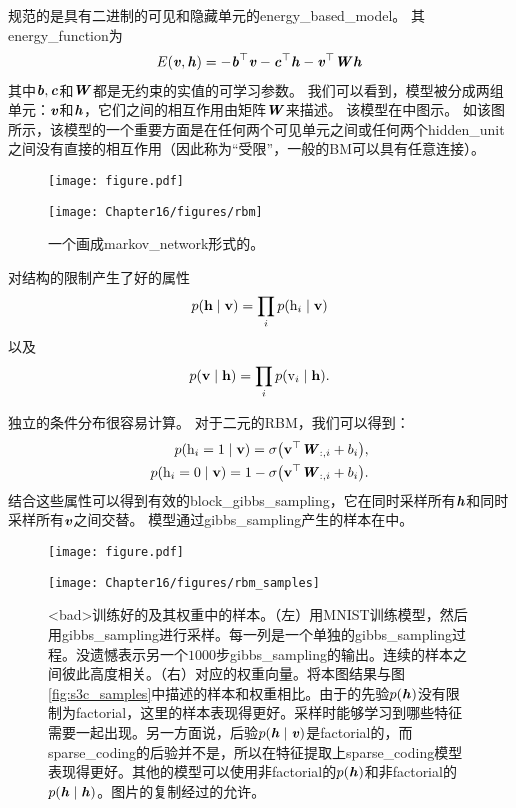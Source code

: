 规范的是具有二进制的可见和隐藏单元的\gls{energy_based_model}。 其\gls{energy_function}为
\begin{align}
\label{eqn:1610}
E(\boldsymbol{\mathit{v}},\boldsymbol{\mathit{h}}) = -\boldsymbol{\mathit{b}}^{\top}\boldsymbol{\mathit{v}} - \boldsymbol{\mathit{c}}^{\top}\boldsymbol{\mathit{h}} - \boldsymbol{\mathit{v}}^{\top}\boldsymbol{\mathit{W}}\boldsymbol{\mathit{h}}
\end{align}
其中$\boldsymbol{\mathit{b}},\boldsymbol{\mathit{c}}$和$\boldsymbol{\mathit{W}}$都是无约束的实值的可学习参数。
我们可以看到，模型被分成两组单元：$\boldsymbol{\mathit{v}}$和$\boldsymbol{\mathit{h}}$，它们之间的相互作用由矩阵$\boldsymbol{\mathit{W}}$来描述。
该模型在中图示。
如该图所示，该模型的一个重要方面是在任何两个可见单元之间或任何两个\gls{hidden_unit}之间没有直接的相互作用（因此称为``受限''，一般的\gls{BM}可以具有任意连接）。



\begin{figure}[!htb]
\ifOpenSource
\centerline{\texttt{[image: figure.pdf]}}
\else
	\centerline{\texttt{[image: Chapter16/figures/rbm]}}	
\fi
	\caption{一个画成\gls{markov_network}形式的。}
	\label{fig:rbm}
\end{figure}



对结构的限制产生了好的属性
\begin{align}
\label{eqn:1611}
p(\mathbf{h}\mid\mathbf{v}) = \prod_i p(\mathrm{h}_i\mid \mathbf{v})
\end{align}
以及
\begin{align}
\label{eqn:1612}
p(\mathbf{v}\mid\mathbf{h}) = \prod_i p(\mathrm{v}_i\mid \mathbf{h}).
\end{align}


独立的条件分布很容易计算。
对于二元的\gls{RBM}，我们可以得到：
\begin{align}
\label{eqn:1613}
\begin{aligned}
p(\mathrm{h}_i = 1\mid\mathbf{v}) = \sigma\big(\mathbf{v}^{\top}\boldsymbol{\mathit{W}}_{:,i} + b_i\big),\\
p(\mathrm{h}_i = 0\mid\mathbf{v}) = 1 - \sigma\big(\mathbf{v}^{\top}\boldsymbol{\mathit{W}}_{:,i} + b_i\big).\\
\end{aligned}
\end{align}
结合这些属性可以得到有效的\gls{block_gibbs_sampling}，它在同时采样所有$\boldsymbol{\mathit{h}}$和同时采样所有$\boldsymbol{\mathit{v}}$之间交替。
模型通过\gls{gibbs_sampling}产生的样本在中。

\begin{figure}[!htb]
\ifOpenSource
\centerline{\texttt{[image: figure.pdf]}}
\else
	\centerline{\texttt{[image: Chapter16/figures/rbm\_samples]}}	
\fi
	\caption{<bad>训练好的及其权重中的样本。（左）用MNIST训练模型，然后用\gls{gibbs_sampling}进行采样。每一列是一个单独的\gls{gibbs_sampling}过程。没遗憾表示另一个$1000$步\gls{gibbs_sampling}的输出。连续的样本之间彼此高度相关。（右）对应的权重向量。将本图结果与图\ref{fig:s3c_samples}中描述的样本和权重相比。由于的先验$p(\boldsymbol{\mathit{h}})$没有限制为\gls{factorial}，这里的样本表现得更好。采样时能够学习到哪些特征需要一起出现。另一方面说，后验$p(\boldsymbol{\mathit{h}} \mid \boldsymbol{\mathit{v}})$是\gls{factorial}的，而\gls{sparse_coding}的后验并不是，所以在特征提取上\gls{sparse_coding}模型表现得更好。其他的模型可以使用非\gls{factorial}的$p(\boldsymbol{\mathit{h}})$和非\gls{factorial}的$p(\boldsymbol{\mathit{h}} \mid \boldsymbol{\mathit{h}})$。图片的复制经过\citet{lisa_tutorial_rbm}的允许。}
	\label{fig:rbm_sample}
\end{figure}


